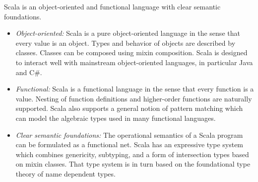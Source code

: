 Scala is an object-oriented and functional language with clear
semantic foundations.
\begin{itemize}
\item[] {\em Object-oriented:}
Scala is a pure object-oriented language in
the sense that every value is an object. Types and behavior of objects are
described by classes. Classes can be composed using mixin composition.
Scala is designed to interact well with mainstream object-oriented
languages, in particular Java and C\#.
\item[] {\em Functional:}
Scala is a functional language in the sense that every function is a
value. Nesting of function definitions and higher-order functions are
naturally supported. Scala also supports a general notion of pattern
matching which can model the algebraic types used in many functional
languages.
\item[] {\em Clear semantic foundations:}
The operational semantics of a Scala program can be formulated as a
functional net. Scala has an expressive type system which combines
genericity, subtyping, and a form of intersection types based on mixin
classes. That type system is in turn based on the foundational type
theory of name dependent types.
\end{itemize}

